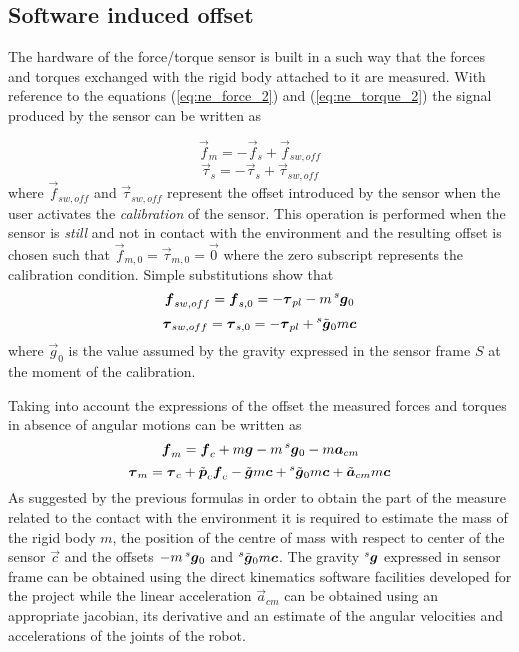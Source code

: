 \subsection{Software induced offset}
The hardware of the force/torque sensor is built in a such way that the forces and torques exchanged
with the rigid body attached to it are measured. With reference to the equations (\ref{eq:ne_force_2})
and (\ref{eq:ne_torque_2}) the signal produced by the sensor can be written as

\[
\vec{f}_{m} = -\vec{f}_{s} + \vec{f}_{sw,off}
\]
\[
\vec{\tau}_{s} = -\vec{\tau}_{s} + \vec{\tau}_{sw,off}
\]
where $\vec{f}_{sw, off}$ and $\vec{\tau}_{sw,off}$ represent the offset introduced by
the sensor when the user activates the \emph{calibration} of the sensor. This operation
is performed when the sensor is \emph{still} and not in contact with the environment
and the resulting offset is chosen such that $\vec{f}_{m,0} = \vec{\tau}_{m,0} = \vec{0}$
where the zero subscript represents the calibration condition. Simple substitutions show that
\[
\vec{f}_{sw,off} = \vec{f}_{s,0} = -\vec{\tau}_{pl} -m \prescript{s}{}{ \vec{g}}_{0}
\]
\[
\vec{\tau}_{sw,off} = \vec{\tau}_{s,0} = -\vec{\tau}_{pl} + \prescript{s}{}{ \tilde{\vec{g}}}_{0} m\vec{c}
\]
where $\vec{g}_{0}$ is the value assumed by the gravity expressed in the sensor frame $S$ at the
moment of the calibration.
\par
Taking into account the expressions of the offset the measured forces and torques in absence of angular
motions can be written as
\begin{equation}
  \label{eq:m_force_2}
  \vec{f}_{m} = \vec{f}_{c} +m \vec{g} -m \prescript{s}{}{ \vec{g}}_{0} - m  \vec{a}_{cm}
\end{equation}
\begin{equation}
  \label{eq:m_torque_2}
  \vec{\tau}_{m} = \vec{\tau}_{c} + \tilde{\vec{p}}_{c}  \vec{f}_{c}
  - \tilde{\vec{g}} m\vec{c} + \prescript{s}{}{ \tilde{\vec{g}}}_{0} m\vec{c} +  \tilde{\vec{a}}_{cm} m  \vec{c}
\end{equation}
As suggested by the previous formulas in order to obtain the part of the measure related to the contact
with the environment it is required to estimate the mass of the rigid body $m$, the position of the centre of
mass with respect to center of the sensor $\vec{c}$ and the offsets $-m \prescript{s}{}{ \vec{g}}_{0}$
and $\prescript{s}{}{ \tilde{\vec{g}}}_{0} m\vec{c}$.
The gravity $\prescript{s}{}{ \vec{g}}$ expressed in sensor frame can be obtained using the direct kinematics software facilities
developed for the project while the linear acceleration $\vec{a}_{cm}$ can be obtained using an appropriate
jacobian, its derivative and an estimate of the angular velocities and accelerations of the joints
of the robot.


